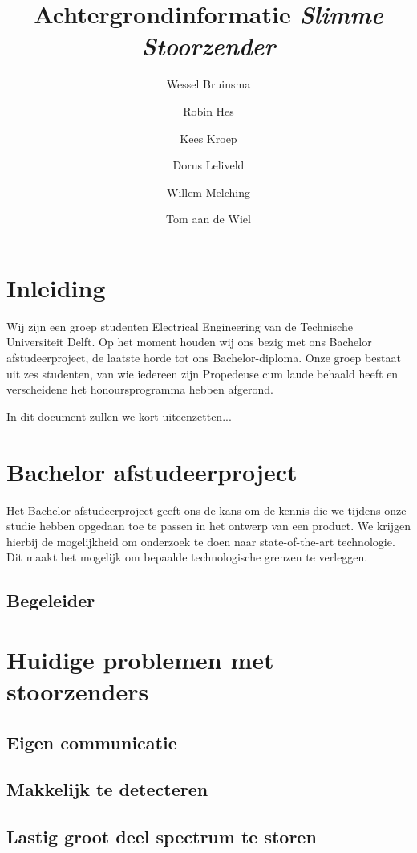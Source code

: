 \documentclass[oneside, a4paper, openany]{article}
\title{Achtergrondinformatie \textit{Slimme Stoorzender}}
\author{Wessel Bruinsma \and Robin Hes \and Kees Kroep \and Dorus Leliveld \and Willem Melching \and Tom aan de Wiel}
\begin{document}
\maketitle

\clearpage

\tableofcontents

\clearpage

\section{Inleiding}
Wij zijn een groep studenten Electrical Engineering van de Technische Universiteit Delft. Op het moment houden wij ons bezig met ons Bachelor afstudeerproject, de laatste horde tot ons Bachelor-diploma. Onze groep bestaat uit zes studenten, van wie iedereen zijn Propedeuse cum laude behaald heeft en verscheidene het honoursprogramma hebben afgerond.

In dit document zullen we kort uiteenzetten...

\section{Bachelor afstudeerproject}
Het Bachelor afstudeerproject geeft ons de kans om de kennis die we tijdens onze studie hebben opgedaan toe te passen in het ontwerp van een product. We krijgen hierbij de mogelijkheid om onderzoek te doen naar state-of-the-art technologie. Dit maakt het mogelijk om bepaalde technologische grenzen te verleggen.



\subsection{Begeleider}

\section{Huidige problemen met stoorzenders}
\subsection{Eigen communicatie}
\subsection{Makkelijk te detecteren}
\subsection{Lastig groot deel spectrum te storen}
\end{document}
